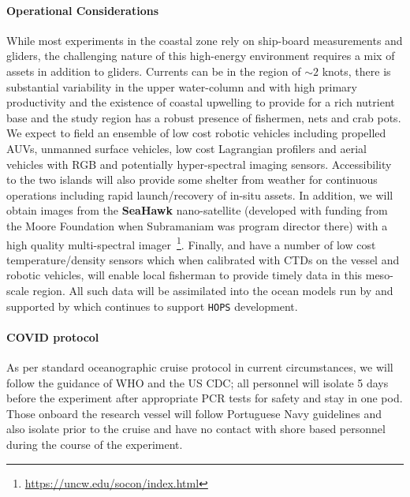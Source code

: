 \paragraph{Operational Considerations} While most experiments in the
coastal zone rely on ship-board measurements and gliders, the
challenging nature of this high-energy environment requires a mix of
assets in addition to gliders. Currents can be in the region of
$\sim 2$ knots, there is substantial variability in the upper
water-column and with high primary productivity and the existence of
coastal upwelling to provide for a rich nutrient base and the study
region has a robust presence of fishermen, nets and crab pots. We
expect to field an ensemble of low cost robotic vehicles including
propelled AUVs, unmanned surface vehicles, low cost Lagrangian
profilers and aerial vehicles with RGB and potentially hyper-spectral
imaging sensors. Accessibility to the two islands will also provide
some shelter from weather for continuous operations including rapid
launch/recovery of in-situ assets. In addition, we will obtain images
from the \textbf{SeaHawk} nano-satellite (developed with funding from
the Moore Foundation when Subramaniam was program director there) with
a high quality multi-spectral
imager~\footnote{\url{https://uncw.edu/socon/index.html}}. Finally,
\univ and \inst have a number of low cost temperature/density sensors
which when calibrated with CTDs on the vessel and robotic vehicles,
will enable local fisherman to provide timely data in this meso-scale
region. All such data will be assimilated into the ocean models run by
\inst and supported by \mit which continues to support \texttt{HOPS}
development.


\paragraph{COVID protocol} As per standard oceanographic cruise
protocol in current circumstances, we will follow the guidance of WHO
and the US CDC; all personnel will isolate 5 days before the
experiment after appropriate PCR tests for safety and stay in one
pod. Those onboard the \inst research vessel will follow Portuguese
Navy guidelines and also isolate prior to the cruise and have no
contact with shore based personnel during the course of the
experiment.
